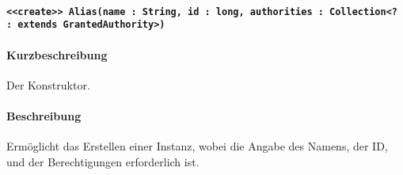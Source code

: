\paragraph{\texttt{<<create>> Alias(name : String, id : long, authorities : Collection<? : extends GrantedAuthority>)}}%
\paragraph*{Kurzbeschreibung}
Der Konstruktor.
\paragraph*{Beschreibung}
Ermöglicht das Erstellen einer Instanz, wobei die Angabe des Namens, der ID, und der Berechtigungen erforderlich ist.
